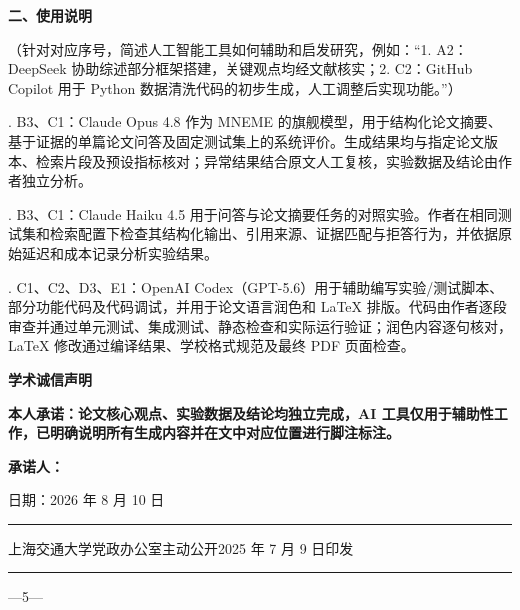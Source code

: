 \thispagestyle{empty}
{\fontsize{14bp}{22bp}\selectfont\bfseries\noindent 二、使用说明\par}
\vspace{0.15cm}
{\fontsize{12bp}{22bp}\selectfont
（针对对应序号，简述人工智能工具如何辅助和启发研究，例如：“1. A2：DeepSeek 协助综述部分框架搭建，关键观点均经文献核实；2. C2：GitHub Copilot 用于 Python 数据清洗代码的初步生成，人工调整后实现功能。”）\par
}
\vspace{0.28cm}
{\fontsize{10.5bp}{21bp}\selectfont
{}. B3、C1：Claude Opus 4.8 作为 MNEME 的旗舰模型，用于结构化论文摘要、基于证据的单篇论文问答及固定测试集上的系统评价。生成结果均与指定论文版本、检索片段及预设指标核对；异常结果结合原文人工复核，实验数据及结论由作者独立分析。\par
\vspace{0.38cm}
. B3、C1：Claude Haiku 4.5 用于问答与论文摘要任务的对照实验。作者在相同测试集和检索配置下检查其结构化输出、引用来源、证据匹配与拒答行为，并依据原始延迟和成本记录分析实验结果。\par
\vspace{0.38cm}
. C1、C2、D3、E1：OpenAI Codex（GPT-5.6）用于辅助编写实验/测试脚本、部分功能代码及代码调试，并用于论文语言润色和 LaTeX 排版。代码由作者逐段审查并通过单元测试、集成测试、静态检查和实际运行验证；润色内容逐句核对，LaTeX 修改通过编译结果、学校格式规范及最终 PDF 页面检查。\par
}

\thispagestyle{empty}
\vspace*{0.45cm}
{\centering\fontsize{18bp}{28bp}\selectfont\bfseries 学术诚信声明\par}
\vspace{0.55cm}
{\fontsize{13bp}{25bp}\selectfont\bfseries
本人承诺：论文核心观点、实验数据及结论均独立完成，AI 工具仅用于辅助性工作，已明确说明所有生成内容并在文中对应位置进行脚注标注。\par
}
\vspace{0.95cm}
{\fontsize{12bp}{22bp}\selectfont\bfseries
\hspace*{8.7cm}承诺人：\par
\vspace{0.35cm}
\hspace*{6.7cm}日期：2026 年 8 月 10 日\par
}
\vfill
{\fontsize{9.5bp}{16bp}\selectfont
\hrule
\vspace{0.12cm}
\noindent 上海交通大学党政办公室\hfill 主动公开\hfill 2025 年 7 月 9 日印发\par
\vspace{0.12cm}
\hrule
}
\vspace{0.35cm}
\begin{center}\fontsize{10.5bp}{12bp}\selectfont —5—\end{center}

\restoregeometry
\endgroup
